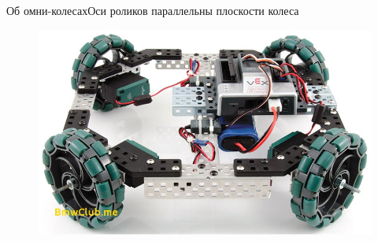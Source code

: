 \begin{frame}{Об омни-колесах}{Оси роликов параллельны плоскости колеса}
\begin{figure}[H]
\begin{columns}
                \centering
                \includegraphics[width=\linewidth]{content/pic/photo/vehicle_four_two_row.jpg}
        \end{columns}
    \end{figure}
\end{frame}

